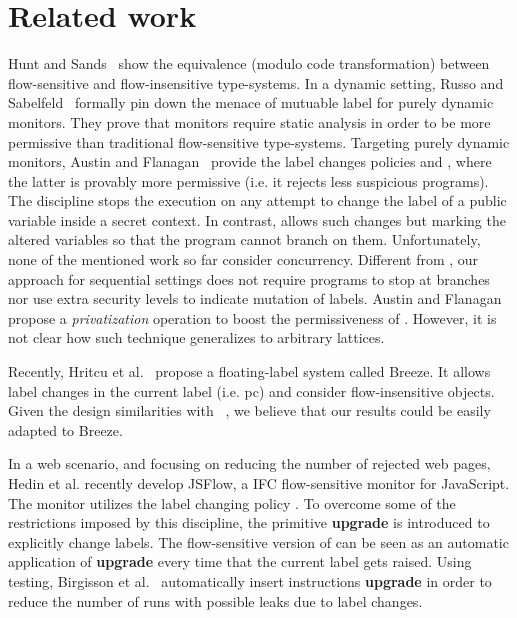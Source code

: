 \section{Related work}

Hunt and Sands~\citep{Hunt:2006} show the equivalence (modulo code
transformation) between flow-sensitive and flow-insensitive type-systems. In a
dynamic setting, Russo and Sabelfeld~\citep{Russo:2010} formally pin down the
menace of mutuable label for purely dynamic monitors. They prove that monitors
require static analysis in order to be more permissive than traditional
flow-sensitive type-systems. Targeting purely dynamic monitors, Austin and
Flanagan~\citep{Austin:Flanagan:PLAS10} provide the label changes policies
\emph{\nsu} and \emph{\pu}, where the latter is provably more permissive
(i.e. it rejects less suspicious programs). The discipline
{\nsu} stops the execution on any attempt to change the label of a public
variable inside a secret context. In contrast, {\pu} allows such changes but
marking the altered variables so that the program cannot branch on
them. Unfortunately, none of the mentioned work so far consider
concurrency. Different from {\pu}, our approach for sequential settings does not
require programs to stop at branches nor use extra security levels to indicate
mutation of labels. Austin and Flanagan propose a \emph{privatization} operation
to boost the permissiveness of {\pu}.  However, it is not clear how such
technique generalizes to arbitrary lattices.  

Recently, Hritcu et al.~\citep{10.1109/SP.2013.10} propose a floating-label
system called Breeze. It allows label changes in the current label (i.e. pc) and
consider flow-insensitive objects. Given the design similarities with
\LIO~\citep{stefan:lio}, we believe that our results could be easily adapted to
Breeze.

In a web scenario, and focusing on reducing the number of rejected web pages,
Hedin et al. \citep{Hedin13} recently develop JSFlow, a IFC flow-sensitive
monitor for JavaScript. The monitor utilizes the label changing policy
{\nsu}. To overcome some of the restrictions imposed by this discipline, the
primitive \textbf{upgrade} is introduced to explicitly change labels. The
flow-sensitive version of {\forkLIO} can be seen as an automatic application of
\textbf{upgrade} every time that the current label gets raised. Using testing,
Birgisson et al.~\citep{Arnar2012} automatically insert instructions
\textbf{upgrade} in order to reduce the number of runs with possible leaks due
to label changes.



